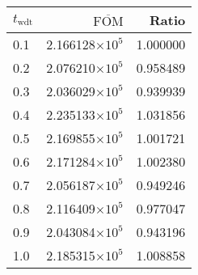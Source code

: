 \begin{tabular}{lrr}
\toprule
$t_{\mathrm{wdt}}$ & $\overline{\mathrm{FOM}}$ &    Ratio \\
\midrule
               0.1 &   2.166128$\times 10^{5}$ & 1.000000 \\
               0.2 &   2.076210$\times 10^{5}$ & 0.958489 \\
               0.3 &   2.036029$\times 10^{5}$ & 0.939939 \\
               0.4 &   2.235133$\times 10^{5}$ & 1.031856 \\
               0.5 &   2.169855$\times 10^{5}$ & 1.001721 \\
               0.6 &   2.171284$\times 10^{5}$ & 1.002380 \\
               0.7 &   2.056187$\times 10^{5}$ & 0.949246 \\
               0.8 &   2.116409$\times 10^{5}$ & 0.977047 \\
               0.9 &   2.043084$\times 10^{5}$ & 0.943196 \\
               1.0 &   2.185315$\times 10^{5}$ & 1.008858 \\
\bottomrule
\end{tabular}
